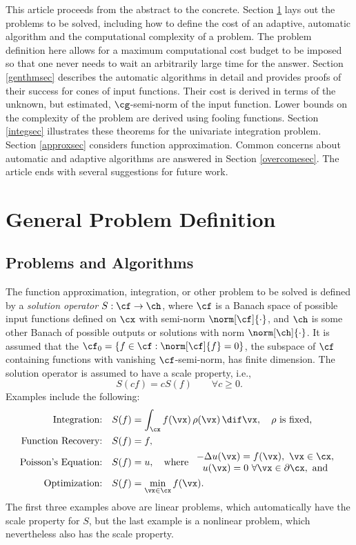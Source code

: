 \documentclass[]{elsarticle}
\theoremstyle{definition}
\theoremstyle{remark}
\begin{document}
This article proceeds from the abstract to the concrete.  Section \ref{probdefsec} lays out the problems to be solved, including how to define the cost of an adaptive, automatic algorithm and the computational complexity of a problem.  The problem definition here allows for a maximum computational cost budget to be imposed so that one never needs to wait an arbitrarily large time for the answer.  Section \ref{genthmsec} describes the automatic algorithms in detail and provides proofs of their success for cones of input functions.  Their cost is derived in terms of the unknown, but estimated, $\cg$-semi-norm of the input function.  Lower bounds on the complexity of the problem are derived using fooling functions.  Section \ref{integsec} illustrates these theorems for the univariate integration problem.  Section \ref{approxsec}  considers function approximation.  Common concerns about automatic and adaptive algorithms are answered in Section \ref{overcomesec}. The article ends with several suggestions for future work.

\section{General Problem Definition} \label{probdefsec}

\subsection{Problems and Algorithms} The function approximation, integration, or other problem to be solved is defined by a \emph{solution operator} $S:\cf \to \ch$, where $\cf$ is a Banach space of possible input functions defined on $\cx$ with semi-norm $\norm[\cf]{\cdot}$, and $\ch$ is some other Banach of possible outputs or solutions with norm $\norm[\ch]{\cdot}$. It is assumed that the $\cf_0 = \{f \in \cf :  \norm[\cf]{f}=0\}$, the subspace of $\cf$ containing functions with vanishing $\cf$-semi-norm, has finite dimension. The solution operator is assumed to have a scale property, i.e., 
\[
S(cf) = cS(f) \qquad \forall c\ge 0.
\]
Examples include the following:
\begin{align*}
\text{Integration:} \quad & S(f) = \int_{\cx} f(\vx) \, \rho(\vx) \, \dif \vx, \quad \rho \text{ is fixed,}\\
\text{Function Recovery:} \quad & S(f) = f, \\
\text{Poisson's Equation:} \quad & S(f) = u, \quad \text{where } \begin{array}{c} -\Delta u(\vx) = f(\vx), \ \vx \in \cx, \\ u(\vx)=0 \ \forall \vx \in \partial \cx, \text{ and}\end{array} \\
\text{Optimization:} \quad & S(f) = \min_{\vx \in \cx} f(\vx).
\end{align*}
The first three examples above are linear problems, which automatically have the scale property for $S$, but the last example is a nonlinear problem, which nevertheless also has the scale property.
\end{document}

